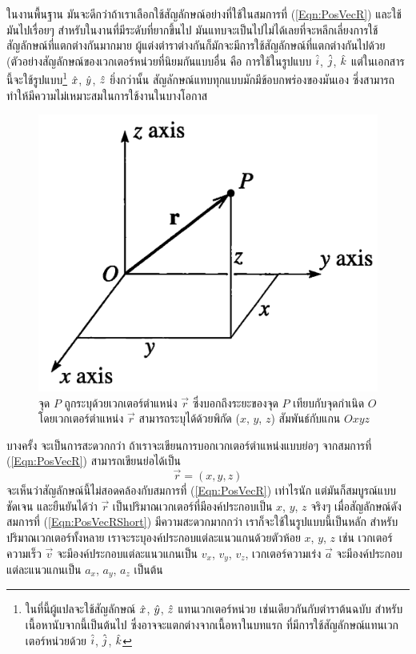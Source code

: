 ในงานพื้นฐาน มันจะดีกว่าถ้าเราเลือกใช้สัญลักษณ์อย่างที่ใช้ในสมการที่ (\ref{Eqn:PosVecR}) และใช้มันไปเรื่อยๆ สำหรับในงานที่มีระดับที่ยากขึ้นไป มันแทบจะเป็นไปไม่ได้เลยที่จะหลีกเลี่ยงการใช้สัญลักษณ์ที่แตกต่างกันมากมาย ผู้แต่งตำราต่างกันก็มักจะมีการใช้สัญลักษณ์ที่แตกต่างกันไปด้วย (ตัวอย่างสัญลักษณ์ของเวกเตอร์หน่วยที่นิยมกันแบบอื่น คือ การใช้ในรูปแบบ $\hat{i}$, $\hat{j}$, $\hat{k}$ แต่ในเอกสารนี้จะใช้รูปแบบ\footnote{ในที่นี้ผู้แปลจะใช้สัญลักษณ์ $\hat{x}$, $\hat{y}$, $\hat{z}$ แทนเวกเตอร์หน่วย เช่นเดียวกันกับตำราต้นฉบับ สำหรับเนื้อหานับจากนี้เป็นต้นไป ซึ่งอาจจะแตกต่างจากเนื้อหาในบทแรก ที่มีการใช้สัญลักษณ์แทนเวกเตอร์หน่วยด้วย $\hat{i}$, $\hat{j}$, $\hat{k}$} $\hat{x}$, $\hat{y}$, $\hat{z}$ ยิ่งกว่านั้น สัญลักษณ์แทบทุกแบบมักมีข้อบกพร่องของมันเอง ซึ่งสามารถทำให้มีความไม่เหมาะสมในการใช้งานในบางโอกาส 

\begin{figure}%
\centering
\includegraphics[width=0.5\columnwidth]{Fig2.1.png}
\caption{จุด $P$ ถูกระบุด้วยเวกเตอร์ตำแหน่ง $\vec{r}$ ซึ่งบอกถึงระยะของจุด $P$ เทียบกับจุดกำเนิด $O$ โดยเวกเตอร์ตำแหน่ง $\vec{r}$ สามารถระบุได้ด้วยพิกัด ($x$, $y$, $z$) สัมพันธ์กับแกน $Oxyz$}
\label{Fig2.1}
\end{figure}

บางครั้ง จะเป็นการสะดวกกว่า ถ้าเราจะเขียนการบอกเวกเตอร์ตำแหน่งแบบย่อๆ จากสมการที่ (\ref{Eqn:PosVecR}) สามารถเขียนย่อได้เป็น
\begin{equation}\label{Eqn:PosVecRShort}
\vec{r} = (x, y, z)
\end{equation}
จะเห็นว่าสัญลักษณ์นี้ไม่สอดคล้องกับสมการที่ (\ref{Eqn:PosVecR}) เท่าไรนัก แต่มันก็สมบูรณ์แบบชัดเจน และยืนยันได้ว่า $\vec{r}$ เป็นปริมาณเวกเตอร์ที่มีองค์ประกอบเป็น $x$, $y$, $z$ จริงๆ เมื่อสัญลักษณ์ดังสมการที่ (\ref{Eqn:PosVecRShort}) มีความสะดวกมากกว่า เราก็จะใช้ในรูปแบบนี้เป็นหลัก สำหรับปริมาณเวกเตอร์ทั้งหลาย เราจะระบุองค์ประกอบแต่ละแนวแกนด้วยตัวห้อย $x$, $y$, $z$ เช่น เวกเตอร์ความเร็ว $\vec{v}$ จะมีองค์ประกอบแต่ละแนวแกนเป็น $v_x$, $v_y$, $v_z$, เวกเตอร์ความเร่ง $\vec{a}$ จะมีองค์ประกอบแต่ละแนวแกนเป็น $a_x$, $a_y$, $a_z$ เป็นต้น


